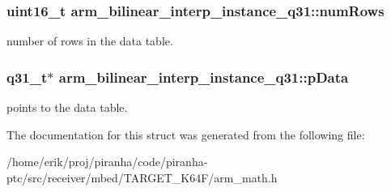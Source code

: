 \subsubsection[{\texorpdfstring{num\+Rows}{numRows}}]{\setlength{\rightskip}{0pt plus 5cm}uint16\+\_\+t arm\+\_\+bilinear\+\_\+interp\+\_\+instance\+\_\+q31\+::num\+Rows}\hypertarget{structarm__bilinear__interp__instance__q31_a2082e3eac56354d75291f03e96ce4aa5}{}\label{structarm__bilinear__interp__instance__q31_a2082e3eac56354d75291f03e96ce4aa5}
number of rows in the data table. 
\subsubsection[{\texorpdfstring{p\+Data}{pData}}]{\setlength{\rightskip}{0pt plus 5cm}q31\+\_\+t$\ast$ arm\+\_\+bilinear\+\_\+interp\+\_\+instance\+\_\+q31\+::p\+Data}\hypertarget{structarm__bilinear__interp__instance__q31_a843eae0c9db5f815e77e1aaf9afea358}{}\label{structarm__bilinear__interp__instance__q31_a843eae0c9db5f815e77e1aaf9afea358}
points to the data table. 

The documentation for this struct was generated from the following file\+:\begin{DoxyCompactItemize}
\item 
/home/erik/proj/piranha/code/piranha-\/ptc/src/receiver/mbed/\+T\+A\+R\+G\+E\+T\+\_\+\+K64\+F/arm\+\_\+math.\+h\end{DoxyCompactItemize}
